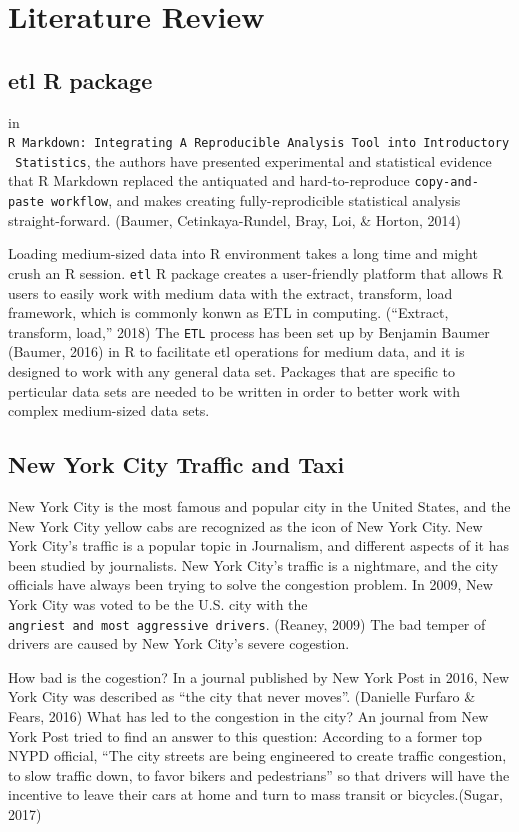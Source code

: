 \documentclass[12pt,twoside]{reedthesis}
\theoremstyle{definition}
\theoremstyle{definition}
\theoremstyle{definition}
\theoremstyle{remark}
\begin{document}
\section{Literature Review}\label{literature-review}

\subsection{etl R package}\label{etl-r-package}

in
\texttt{R\ Markdown:\ Integrating\ A\ Reproducible\ Analysis\ Tool\ into\ Introductory\ Statistics},
the authors have presented experimental and statistical evidence that R
Markdown replaced the antiquated and hard-to-reproduce
\texttt{copy-and-paste\ workflow}, and makes creating fully-reprodicible
statistical analysis straight-forward. (Baumer, Cetinkaya-Rundel, Bray,
Loi, \& Horton, 2014)

Loading medium-sized data into R environment takes a long time and might
crush an R session. \texttt{etl} R package creates a user-friendly
platform that allows R users to easily work with medium data with the
extract, transform, load framework, which is commonly konwn as ETL in
computing. (``Extract, transform, load,'' 2018) The \texttt{ETL} process
has been set up by Benjamin Baumer (Baumer, 2016) in R to facilitate etl
operations for medium data, and it is designed to work with any general
data set. Packages that are specific to perticular data sets are needed
to be written in order to better work with complex medium-sized data
sets.

\subsection{New York City Traffic and
Taxi}\label{new-york-city-traffic-and-taxi}

New York City is the most famous and popular city in the United States,
and the New York City yellow cabs are recognized as the icon of New York
City. New York City's traffic is a popular topic in Journalism, and
different aspects of it has been studied by journalists. New York City's
traffic is a nightmare, and the city officials have always been trying
to solve the congestion problem. In 2009, New York City was voted to be
the U.S. city with the
\texttt{angriest\ and\ most\ aggressive\ drivers}. (Reaney, 2009) The
bad temper of drivers are caused by New York City's severe cogestion.

How bad is the cogestion? In a journal published by New York Post in
2016, New York City was described as ``the city that never moves''.
(Danielle Furfaro \& Fears, 2016) What has led to the congestion in the
city? An journal from New York Post tried to find an answer to this
question: According to a former top NYPD official, ``The city streets
are being engineered to create traffic congestion, to slow traffic down,
to favor bikers and pedestrians'' so that drivers will have the
incentive to leave their cars at home and turn to mass transit or
bicycles.(Sugar, 2017)
\end{document}
